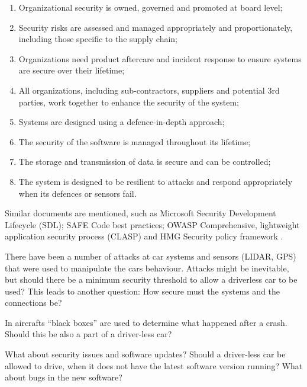 \begin{enumerate}
\item Organizational security is owned, governed and promoted at board level;
\item Security risks are assessed and managed appropriately and proportionately, including those specific to the supply chain;
\item Organizations need product aftercare and incident response to ensure systems are secure over their lifetime;
\item All organizations, including sub-contractors, suppliers and potential 3rd parties, work together to enhance the security of the system;
\item Systems are designed using a defence-in-depth approach;
\item The security of the software is managed throughout its lifetime;
\item The storage and transmission of data is secure and can be controlled;
\item The system is designed to be resilient to attacks and respond appropriately when its defences or sensors fail.
\end{enumerate}

Similar documents are mentioned, such as Microsoft Security Development Lifecycle (SDL); SAFE Code best practices; OWASP Comprehensive, lightweight application security process (CLASP) and HMG Security policy framework \cite{DepartmentforTransportDfT2017}.

There have been a number of attacks at car systems and sensors (LIDAR, GPS) that were used to manipulate the cars behaviour. Attacks might be inevitable, but should there be a minimum security threshold to allow a driverless car to be used? This leads to another question: How secure must the systems and the connections be? 

In aircrafts \enquote{black boxes} are used to determine what happened after a crash. Should this be also a part of a driver-less car? 

What about security issues and software updates? Should a driver-less car be allowed to drive, when it does not have the latest software version running? What about bugs in the new software?

